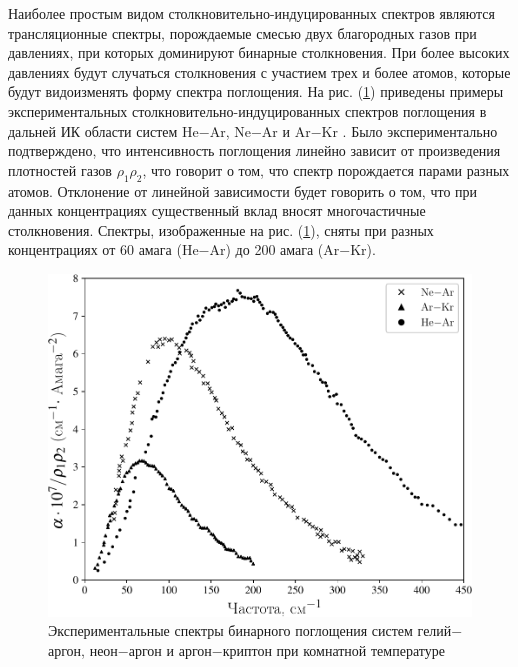     Наиболее простым видом столкновительно-индуцированных спектров являются трансляционные спектры, порождаемые смесью двух благородных газов при давлениях, при которых доминируют бинарные столкновения. При более высоких давлениях будут случаться столкновения с участием трех и более атомов, которые будут видоизменять форму спектра поглощения. На рис. (\ref{fig:pic-two-atom-experiment}) приведены примеры экспериментальных столкновительно-индуцированных спектров поглощения в дальней ИК области систем He$-$Ar, Ne$-$Ar и Ar$-$Kr \cite{frommhold}. Было экспериментально подтверждено, что интенсивность поглощения линейно зависит от произведения плотностей газов $\rho_1 \rho_2$, что говорит о том, что спектр порождается парами разных атомов. Отклонение от линейной зависимости будет говорить о том, что при данных концентрациях существенный вклад вносят многочастичные столкновения. Спектры, изображенные на рис. (\ref{fig:pic-two-atom-experiment}), сняты при разных концентрациях от 60 амага (He$-$Ar) до 200 амага (Ar$-$Kr).  

\setcounter{figure}{0}
\begin{figure}[H]
    \centering
    \includegraphics[width=0.7\linewidth]{./pictures/twoatom_experiment/experiment_diatom_spectra-crop.pdf}
    \caption{Экспериментальные спектры бинарного поглощения систем гелий$-$аргон, неон$-$аргон и аргон$-$криптон при комнатной температуре \cite{frommhold}}
    \label{fig:pic-two-atom-experiment}
\end{figure}

